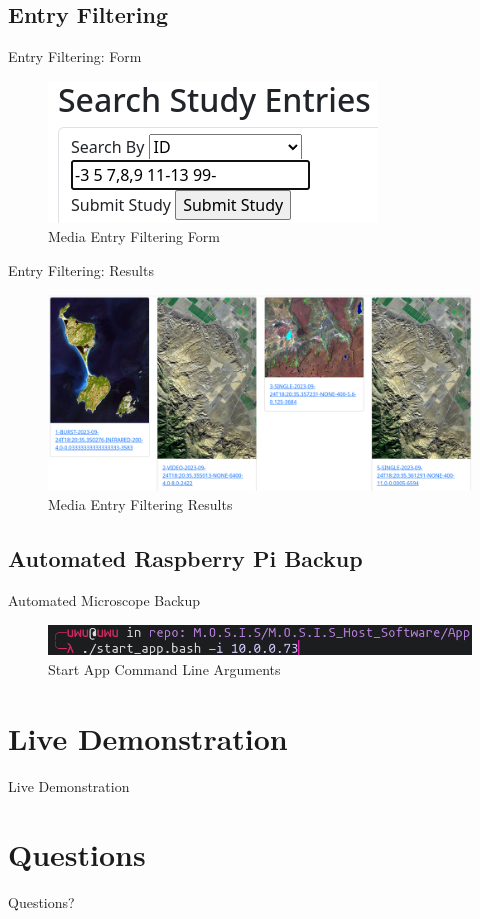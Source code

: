 \documentclass[17pt, aspectratio=169]{beamer}
\begin{document}
\subsection{Entry Filtering}
\begin{frame}{Entry Filtering: Form}
	\begin{figure}
		\includegraphics[height=0.55\textheight]{./Figures/entry_filtering_form.png}
		\caption{Media Entry Filtering Form}
	\end{figure}

\end{frame}
\begin{frame}{Entry Filtering: Results}
	\begin{figure}
		\includegraphics[height=0.55\textheight]{./Figures/entry_filtering_results.png}
		\caption{Media Entry Filtering Results}
	\end{figure}

\end{frame}
\subsection{Automated Raspberry Pi Backup}
\begin{frame}{Automated Microscope Backup}
	\begin{figure}
		\includegraphics[width=\textwidth]{./Figures/automated_media_backup.png}
		\caption{Start App Command Line Arguments}
	\end{figure}
\end{frame}
\section{Live Demonstration}
\begin{frame}
	\centering Live Demonstration
\end{frame}
\section*{Questions}
\begin{frame}
	\centering Questions?
\end{frame}
\end{document}

